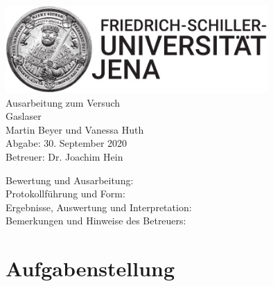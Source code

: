 \documentclass[a4paper,twoside,final]{article}
\begin{document}
\setlength{\marginparsep}{2em}
\renewcommand{\theequation}{\arabic{section}.\arabic{equation}}
\renewcommand{\thefigure}{\arabic{section}.\arabic{figure}}
\renewcommand{\thetable}{\arabic{section}.\arabic{table}}

\begin{center}
\thispagestyle{empty}
  \includegraphics[width=0.75\textwidth]{../UniJena_BildWortMarke_black.pdf}\\[4em]
  \Large
  Ausarbeitung zum Versuch\\[2em]
  \Huge
  Gaslaser\\
  \vspace{2cm}
  \Large
  Martin Beyer und Vanessa Huth\\[2em]
  Abgabe: 30. September 2020\\[2em]
  Betreuer: Dr. Joachim Hein\\[5em]
  \begin{flushleft}
  	Bewertung und Ausarbeitung:\\[2em]
		Protokollführung und Form:\\[1em]
		Ergebnisse, Auswertung und Interpretation:\\[1em]
		Bemerkungen und Hinweise des Betreuers:
  \end{flushleft}
\end{center}
\clearpage

\pagestyle{fancy}
\renewcommand{\headrulewidth}{0pt}
\renewcommand{\footrulewidth}{0.5pt}
\renewcommand{\sectionmark}[1]{\markright{#1}}
\fancyhead[RE,LO]{\rightmark}
\fancyfoot[LE,RO]{\bfseries\thepage}
\renewcommand{\headrulewidth}{0.5pt}
\renewcommand{\footrulewidth}{0.5pt}

\setcounter{equation}{0}
\setcounter{figure}{0}

\tableofcontents
\newpage
\section{Aufgabenstellung} \label{sec:Aufgabenstellung}
\end{document}
